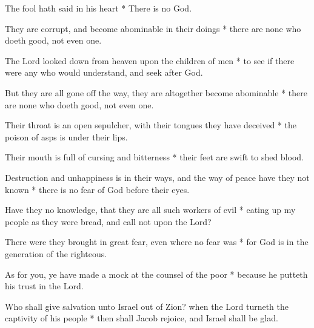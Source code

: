 The fool hath said in his heart * There is no God.

They are corrupt, and become abominable in their doings * there are none who doeth good, not even one.

The Lord looked down from heaven upon the children of men * to see if there were any who would understand, and seek after God.

But they are all gone off the way, they are altogether become abominable * there are none who doeth good, not even one.

Their throat is an open sepulcher, with their tongues they have deceived * the poison of asps is under their lips.

Their mouth is full of cursing and bitterness * their feet are swift to shed blood.

Destruction and unhappiness is in their ways, and the way of peace have they not known * there is no fear of God before their eyes.

Have they no knowledge, that they are all such workers of evil * eating up my people as they were bread, and call not upon the Lord?

There were they brought in great fear, even where no fear was * for God is in the generation of the righteous.

As for you, ye have made a mock at the counsel of the poor * because he putteth his trust in the Lord.

Who shall give salvation unto Israel out of Zion? when the Lord turneth the captivity of his people * then shall Jacob rejoice, and Israel shall be glad.